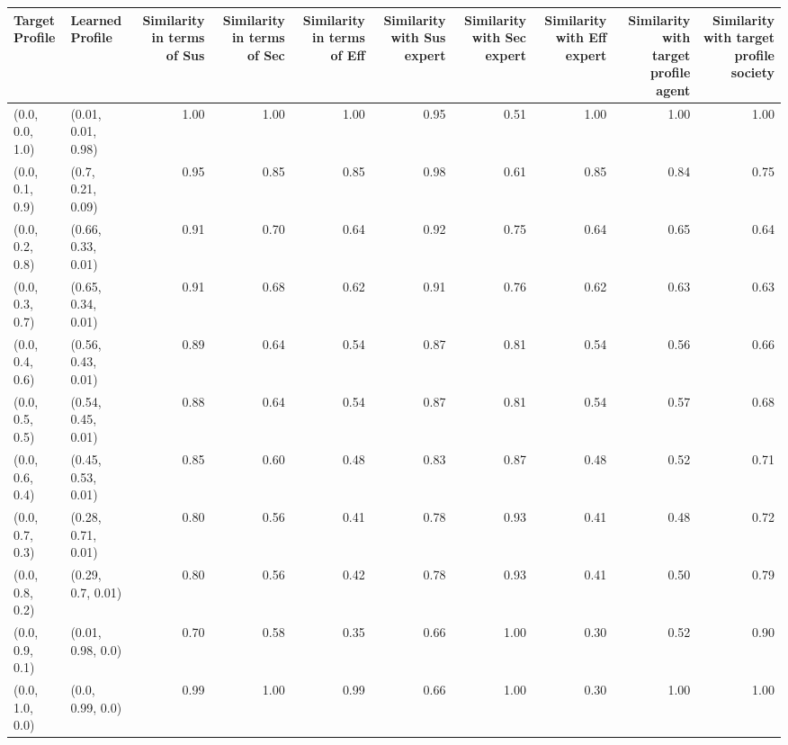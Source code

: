 \begin{tabular}{llrrrrrrrr}
\toprule
Target Profile & Learned Profile & Similarity in terms of Sus & Similarity in terms of Sec & Similarity in terms of Eff & Similarity with Sus expert & Similarity with Sec expert & Similarity with Eff expert & Similarity with target profile agent & Similarity with target profile society \\
\midrule
(0.0, 0.0, 1.0) & (0.01, 0.01, 0.98) & 1.00 & 1.00 & 1.00 & 0.95 & 0.51 & 1.00 & 1.00 & 1.00 \\
(0.0, 0.1, 0.9) & (0.7, 0.21, 0.09) & 0.95 & 0.85 & 0.85 & 0.98 & 0.61 & 0.85 & 0.84 & 0.75 \\
(0.0, 0.2, 0.8) & (0.66, 0.33, 0.01) & 0.91 & 0.70 & 0.64 & 0.92 & 0.75 & 0.64 & 0.65 & 0.64 \\
(0.0, 0.3, 0.7) & (0.65, 0.34, 0.01) & 0.91 & 0.68 & 0.62 & 0.91 & 0.76 & 0.62 & 0.63 & 0.63 \\
(0.0, 0.4, 0.6) & (0.56, 0.43, 0.01) & 0.89 & 0.64 & 0.54 & 0.87 & 0.81 & 0.54 & 0.56 & 0.66 \\
(0.0, 0.5, 0.5) & (0.54, 0.45, 0.01) & 0.88 & 0.64 & 0.54 & 0.87 & 0.81 & 0.54 & 0.57 & 0.68 \\
(0.0, 0.6, 0.4) & (0.45, 0.53, 0.01) & 0.85 & 0.60 & 0.48 & 0.83 & 0.87 & 0.48 & 0.52 & 0.71 \\
(0.0, 0.7, 0.3) & (0.28, 0.71, 0.01) & 0.80 & 0.56 & 0.41 & 0.78 & 0.93 & 0.41 & 0.48 & 0.72 \\
(0.0, 0.8, 0.2) & (0.29, 0.7, 0.01) & 0.80 & 0.56 & 0.42 & 0.78 & 0.93 & 0.41 & 0.50 & 0.79 \\
(0.0, 0.9, 0.1) & (0.01, 0.98, 0.0) & 0.70 & 0.58 & 0.35 & 0.66 & 1.00 & 0.30 & 0.52 & 0.90 \\
(0.0, 1.0, 0.0) & (0.0, 0.99, 0.0) & 0.99 & 1.00 & 0.99 & 0.66 & 1.00 & 0.30 & 1.00 & 1.00 \\
\bottomrule
\end{tabular}
